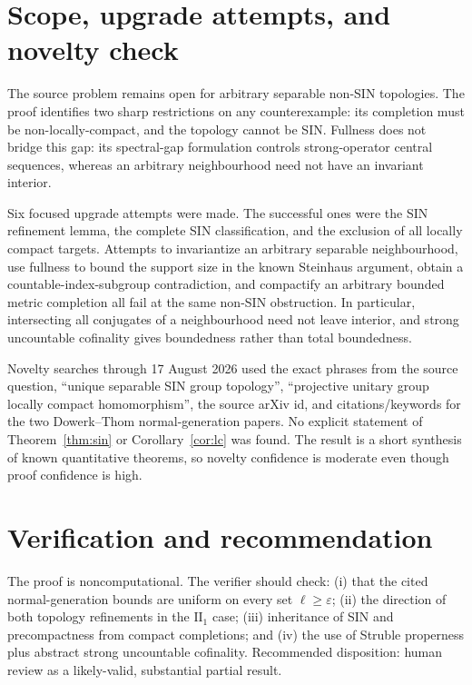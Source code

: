 \documentclass[11pt]{article}
\begin{document}
\section{Scope, upgrade attempts, and novelty check}

The source problem remains open for arbitrary separable non-SIN topologies.
The proof identifies two sharp restrictions on any counterexample: its
completion must be non-locally-compact, and the topology cannot be SIN.
Fullness does not bridge this gap: its spectral-gap formulation controls
strong-operator central sequences, whereas an arbitrary neighbourhood need
not have an invariant interior.

Six focused upgrade attempts were made.  The successful ones were the SIN
refinement lemma, the complete SIN classification, and the exclusion of all
locally compact targets.  Attempts to invariantize an arbitrary separable
neighbourhood, use fullness to bound the support size in the known Steinhaus
argument, obtain a countable-index-subgroup contradiction, and compactify an
arbitrary bounded metric completion all fail at the same non-SIN obstruction.
In particular, intersecting all conjugates of a neighbourhood need not leave
interior, and strong uncountable cofinality gives boundedness rather than total
boundedness.

Novelty searches through 17 August 2026 used the exact phrases from the source
question, ``unique separable SIN group topology'', ``projective unitary group
locally compact homomorphism'', the source arXiv id, and citations/keywords for
the two Dowerk--Thom normal-generation papers.  No explicit statement of
Theorem~\ref{thm:sin} or Corollary~\ref{cor:lc} was found.  The result is a
short synthesis of known quantitative theorems, so novelty confidence is
moderate even though proof confidence is high.

\section{Verification and recommendation}

The proof is noncomputational.  The verifier should check: (i) that the cited
normal-generation bounds are uniform on every set $\ell\geq\varepsilon$;
(ii) the direction of both topology refinements in the $\mathrm{II}_1$ case;
(iii) inheritance of SIN and precompactness from compact completions; and
(iv) the use of Struble properness plus abstract strong uncountable
cofinality.  Recommended disposition: human review as a likely-valid,
substantial partial result.
\end{document}
